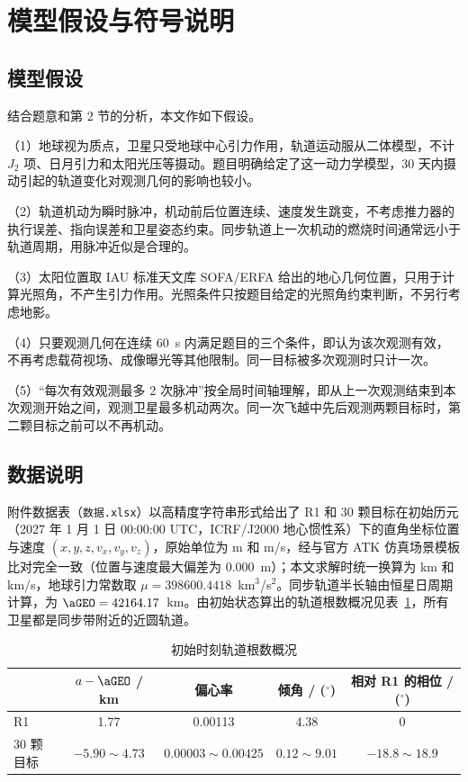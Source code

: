\clearpage
\section{模型假设与符号说明}

\subsection{模型假设}

结合题意和第 2 节的分析，本文作如下假设。

（1）地球视为质点，卫星只受地球中心引力作用，轨道运动服从二体模型，不计 $J_2$ 项、日月引力和太阳光压等摄动。题目明确给定了这一动力学模型，30 天内摄动引起的轨道变化对观测几何的影响也较小。

（2）轨道机动为瞬时脉冲，机动前后位置连续、速度发生跳变，不考虑推力器的执行误差、指向误差和卫星姿态约束。同步轨道上一次机动的燃烧时间通常远小于轨道周期，用脉冲近似是合理的。

（3）太阳位置取 IAU 标准天文库 SOFA/ERFA\cite{sofa} 给出的地心几何位置，只用于计算光照角，不产生引力作用。光照条件只按题目给定的光照角约束判断，不另行考虑地影。

（4）只要观测几何在连续 60~s 内满足题目的三个条件，即认为该次观测有效，不再考虑载荷视场、成像曝光等其他限制。同一目标被多次观测时只计一次。

（5）“每次有效观测最多 2 次脉冲”按全局时间轴理解，即从上一次观测结束到本次观测开始之间，观测卫星最多机动两次。同一次飞越中先后观测两颗目标时，第二颗目标之前可以不再机动。

\subsection{数据说明}

附件数据表（\texttt{数据.xlsx}）以高精度字符串形式给出了 R1 和 30 颗目标在初始历元（2027 年 1 月 1 日 00:00:00 UTC，ICRF/J2000 地心惯性系）下的直角坐标位置与速度 $(x, y, z, v_x, v_y, v_z)$，原始单位为 m 和 m/s，经与官方 ATK 仿真场景模板比对完全一致（位置与速度最大偏差为 $0.000$~m）；本文求解时统一换算为 km 和 km/s，地球引力常数取 $\mu = 398600.4418$~km$^3$/s$^2$。同步轨道半长轴由恒星日周期计算，为 $\aGEO = 42164.17$~km。由初始状态算出的轨道根数概况见表~\ref{tab:elements}，所有卫星都是同步带附近的近圆轨道。

\begin{table}[!htb]
  \centering
  \caption{初始时刻轨道根数概况}
  \label{tab:elements}
  \begin{tabular}{lcccc}
    \toprule
     & $a-\aGEO$ / km & 偏心率 & 倾角 / ($^\circ$) & 相对 R1 的相位 / ($^\circ$) \\
    \midrule
    R1 & 1.77 & 0.00113 & 4.38 & 0 \\
    30 颗目标 & $-5.90 \sim 4.73$ & $0.00003 \sim 0.00425$ & $0.12 \sim 9.01$ & $-18.8 \sim 18.9$ \\
    \bottomrule
  \end{tabular}
\end{table}

